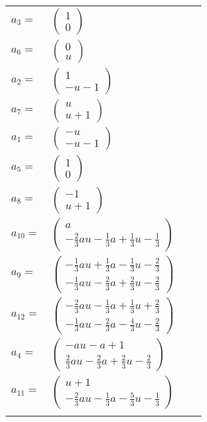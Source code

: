 \documentclass[1p]{elsarticle_modified}
\theoremstyle{definition}
\begin{document}
\begin{tabular}{m{7pt} m{180pt} m{7pt} m{180pt} }
\flushright $a_{3}=$&$\begin{pmatrix}1\\0\end{pmatrix}$ \\
\flushright $a_{6}=$&$\begin{pmatrix}0\\u\end{pmatrix}$ \\
\flushright $a_{2}=$&$\begin{pmatrix}1\\- u-1\end{pmatrix}$ \\
\flushright $a_{7}=$&$\begin{pmatrix}u\\u+1\end{pmatrix}$ \\
\flushright $a_{1}=$&$\begin{pmatrix}- u\\- u-1\end{pmatrix}$ \\
\flushright $a_{5}=$&$\begin{pmatrix}1\\0\end{pmatrix}$ \\
\flushright $a_{8}=$&$\begin{pmatrix}-1\\u+1\end{pmatrix}$ \\
\flushright $a_{10}=$&$\begin{pmatrix}a\\-\frac{2}{3} a u-\frac{1}{3} a+\frac{1}{3} u-\frac{1}{3}\end{pmatrix}$ \\
\flushright $a_{9}=$&$\begin{pmatrix}-\frac{1}{3} a u+\frac{1}{3} a-\frac{1}{3} u-\frac{2}{3}\\-\frac{1}{3} a u-\frac{2}{3} a+\frac{2}{3} u-\frac{2}{3}\end{pmatrix}$ \\
\flushright $a_{12}=$&$\begin{pmatrix}-\frac{2}{3} a u-\frac{1}{3} a+\frac{1}{3} u+\frac{2}{3}\\-\frac{1}{3} a u-\frac{2}{3} a-\frac{4}{3} u-\frac{2}{3}\end{pmatrix}$ \\
\flushright $a_{4}=$&$\begin{pmatrix}- a u- a+1\\\frac{2}{3} a u-\frac{2}{3} a+\frac{2}{3} u-\frac{2}{3}\end{pmatrix}$ \\
\flushright $a_{11}=$&$\begin{pmatrix}u+1\\-\frac{2}{3} a u-\frac{1}{3} a-\frac{5}{3} u-\frac{1}{3}\end{pmatrix}$\\&\end{tabular}
\end{document}
